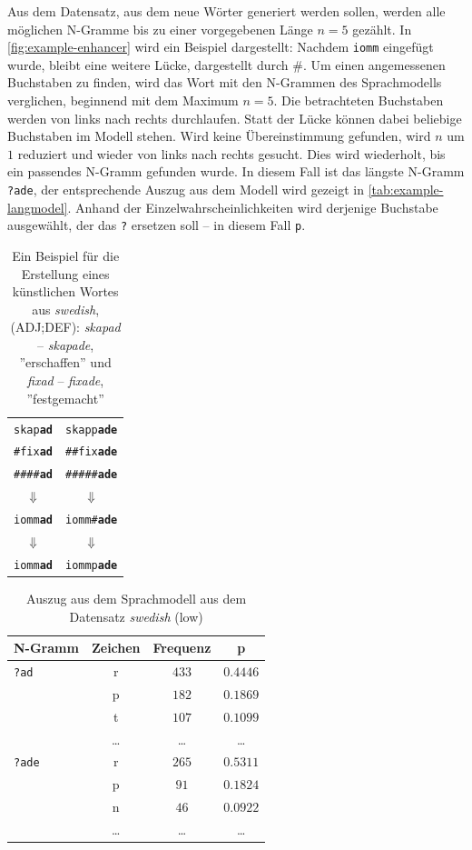 \documentclass[11pt,a4paper]{article}
\newcommand{\lang}[1]{\textit{#1}}
\begin{document}
Aus dem Datensatz, aus dem neue Wörter generiert werden sollen, werden alle möglichen N-Gramme bis zu einer vorgegebenen Länge $n=5$ gezählt. In \autoref{fig:example-enhancer} wird ein Beispiel dargestellt: Nachdem \texttt{iomm} eingefügt wurde, bleibt eine weitere Lücke, dargestellt durch \#. Um einen angemessenen Buchstaben zu finden, wird das Wort mit den N-Grammen des Sprachmodells verglichen, beginnend mit dem Maximum $n = 5$. Die betrachteten Buchstaben werden von links nach rechts durchlaufen. Statt der Lücke können dabei beliebige Buchstaben im Modell stehen. Wird keine Übereinstimmung gefunden, wird $n$ um $1$ reduziert und wieder von links nach rechts gesucht. Dies wird wiederholt, bis ein passendes N-Gramm gefunden wurde. In diesem Fall ist das längste N-Gramm \texttt{?ade}, der entsprechende Auszug aus dem Modell wird gezeigt in \autoref{tab:example-langmodel}. Anhand der Einzelwahrscheinlichkeiten wird derjenige Buchstabe ausgewählt, der das \texttt{?} ersetzen soll -- in diesem Fall \texttt{p}.

\begin{table}
\centering
\begin{tabular}{cc}
\toprule
\texttt{skap\textbf{ad}} & \texttt{skapp\textbf{ade}}\\  %
\texttt{\#fix\textbf{ad}} & \texttt{\#\#fix\textbf{ade}}\\ \midrule
\texttt{\#\#\#\#\textbf{ad}} & \texttt{\#\#\#\#\#\textbf{ade}} \\
$\Downarrow$ & $\Downarrow$\\
\texttt{iomm\textbf{ad}} & \texttt{iomm\#\textbf{ade}}\\
$\Downarrow$ & $\Downarrow$\\
\texttt{iomm\textbf{ad}} & \texttt{iommp\textbf{ade}}\\
\bottomrule
\end{tabular}
\caption{Ein Beispiel für die Erstellung eines künstlichen Wortes aus \lang{swedish}, (ADJ;DEF): \textit{skapad} -- \textit{skapade}, ''erschaffen'' und \textit{fixad} -- \textit{fixade}, ''festgemacht''}
\label{fig:example-enhancer}
\end{table}

\begin{table}
\centering
\begin{tabular}{lccc}
\toprule
N-Gramm & Zeichen & Frequenz & p\\ \midrule
 \texttt{?ad} & r & $433$ & $0.4446$ \\
 & p & $182$ & $0.1869$\\
 & t & $107$ & $0.1099$\\ 
& \ldots & \ldots & \ldots \\ \midrule
\texttt{?ade} & r & $265$ & $0.5311$\\
 & p & $91$ & $0.1824$\\
 & n & $46$ & $0.0922$ \\
 & \ldots & \ldots & \ldots \\ 
 \bottomrule
\end{tabular}
\caption{Auszug aus dem Sprachmodell aus dem Datensatz \lang{swedish} (low)}
\label{tab:example-langmodel}
\end{table}
\end{document}

